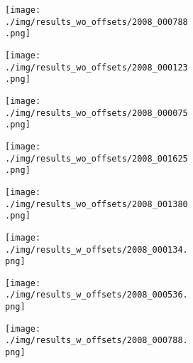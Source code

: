 \documentclass[10pt,twocolumn,letterpaper]{article}
\begin{document}
\begin{figure}[t]
\begin{subfigure}[t]{0.11\textwidth}
        \begin{subfigure}[t]{\textwidth}
                \texttt{[image: ./img/results\_wo\_offsets/2008\_000788.png]}
            \end{subfigure}\vspace{.1ex}

\begin{subfigure}[t]{\textwidth}
                \texttt{[image: ./img/results\_wo\_offsets/2008\_000123.png]}
            \end{subfigure}\vspace{.1ex}

\begin{subfigure}[t]{\textwidth}
                \texttt{[image: ./img/results\_wo\_offsets/2008\_000075.png]}
            \end{subfigure}\vspace{.1ex}

\begin{subfigure}[t]{\textwidth}
                \texttt{[image: ./img/results\_wo\_offsets/2008\_001625.png]}
            \end{subfigure}\vspace{.1ex}

            \begin{subfigure}[t]{\textwidth}
                \texttt{[image: ./img/results\_wo\_offsets/2008\_001380.png]}
            \captionsetup{justification=centering}
        \label{6c}
            \end{subfigure}
    \end{subfigure}
\begin{subfigure}[t]{0.11\textwidth}
        \begin{subfigure}[t]{\textwidth}
                \texttt{[image: ./img/results\_w\_offsets/2008\_000134.png]}
            \end{subfigure}\vspace{.1ex}

        \begin{subfigure}[t]{\textwidth}
                \texttt{[image: ./img/results\_w\_offsets/2008\_000536.png]}
            \end{subfigure}\vspace{.1ex}

        \begin{subfigure}[t]{\textwidth}
                \texttt{[image: ./img/results\_w\_offsets/2008\_000788.png]}
            \end{subfigure}\vspace{.1ex}


\end{subfigure}
\end{figure}
\end{document}
